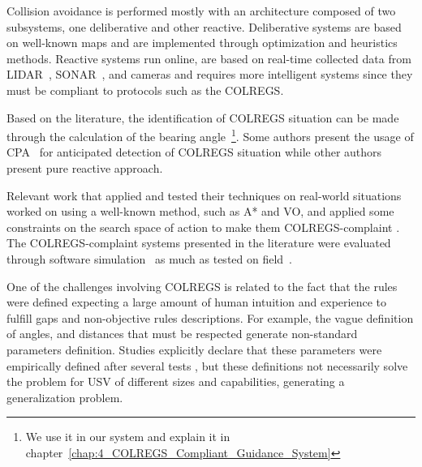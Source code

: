     Collision avoidance is performed mostly with an architecture composed of two subsystems, one deliberative and other reactive. Deliberative systems are based on well-known maps and are implemented through optimization and heuristics methods. Reactive systems run online, are based on real-time collected data from \ac{LIDAR}~\cite{Agrawal2015COLREGS}, \ac{SONAR}~\cite{Candeloro2017Voronoi}, and cameras\cite{Kuwata2014Safe} and requires more intelligent systems since they must be compliant to protocols such as the \ac{COLREGS}. 
    
    Based on the literature, the identification of \ac{COLREGS} situation can be made through the calculation of the bearing angle~\cite{Kuwata2014Safe}\footnote{We use it in our system and explain it in chapter~\ref{chap:4_COLREGS_Compliant_Guidance_System}}. Some authors present the usage of \ac{CPA}~\cite{Campbell2013Automatic} for anticipated detection of \ac{COLREGS} situation while other authors present pure reactive approach.
    
    Relevant work that applied and tested their techniques on real-world situations worked on using a well-known method, such as A* and \ac{VO}, and applied some constraints on the search space of action to make them \ac{COLREGS}-complaint \cite{Kuwata2014Safe, Campbell2013Automatic}. 
    The \ac{COLREGS}-complaint systems presented in the literature were evaluated through software simulation~\cite{Soltan2009Trajectory, Abdelaal2017NMPC, Benjamin2004COLREGS, Lee2004Fuzzy} as much as tested on field~\cite{Agrawal2015COLREGS, Benjamin2004COLREGS, Kuwata2014Safe}.
    
    One of the challenges involving \ac{COLREGS} is related to the fact that the rules were defined expecting a large amount of human intuition and experience to fulfill gaps and non-objective rules descriptions. For example, the vague definition of angles, and distances that must be respected generate non-standard parameters definition. Studies explicitly declare that these parameters were empirically defined after several tests \cite{Larson2007Advances}, but these definitions not necessarily solve the problem for \ac{USV} of different sizes and capabilities, generating a generalization problem.
    
    
    
    
    
    
